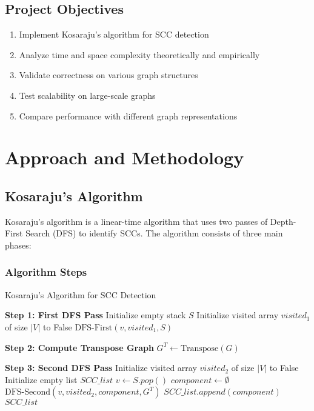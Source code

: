 \documentclass[12pt]{article}
\begin{document}
\subsection{Project Objectives}
\begin{enumerate}
    \item Implement Kosaraju's algorithm for SCC detection
    \item Analyze time and space complexity theoretically and empirically
    \item Validate correctness on various graph structures
    \item Test scalability on large-scale graphs
    \item Compare performance with different graph representations
\end{enumerate}

\section{Approach and Methodology}
\subsection{Kosaraju's Algorithm}

Kosaraju's algorithm is a linear-time algorithm that uses two passes of Depth-First Search (DFS) to identify SCCs. The algorithm consists of three main phases:

\subsubsection{Algorithm Steps}

\begin{engorithm}
\caption{Kosaraju's Algorithm for SCC Detection}
\begin{algorithmic}[1]
\State \textbf{Step 1: First DFS Pass}
\State Initialize empty stack $S$
\State Initialize visited array $visited_1$ of size $|V|$ to False
        \State $\text{DFS-First}(v, visited_1, S)$
    \EndIf
\EndFor

\State \textbf{Step 2: Compute Transpose Graph}
\State $G^T \gets \text{Transpose}(G)$

\State \textbf{Step 3: Second DFS Pass}
\State Initialize visited array $visited_2$ of size $|V|$ to False
\State Initialize empty list $SCC\_list$
    \State $v \gets S.pop()$
        \State $component \gets \emptyset$
        \State $\text{DFS-Second}(v, visited_2, component, G^T)$
        \State $SCC\_list.append(component)$
    \EndIf
\EndWhile
\State \Return $SCC\_list$
\EndProcedure
\end{algorithmic}
\end{engorithm}
\end{document}
